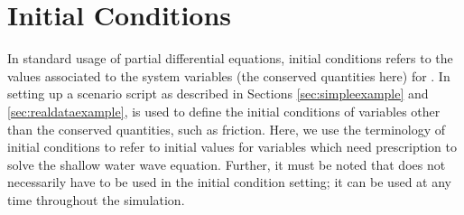 \documentclass{manual}
\begin{document}
\section{Initial Conditions}
\label{sec:initial conditions}
In standard usage of partial differential equations, initial conditions
refers to the values associated to the system variables (the conserved
quantities here) for . In setting up a scenario script
as described in Sections \ref{sec:simpleexample} and \ref{sec:realdataexample},
 is used to define the initial conditions of variables
other than the conserved quantities, such as friction. Here, we use the terminology
of initial conditions to refer to initial values for variables which need
prescription to solve the shallow water wave equation. Further, it must be noted
that  does not necessarily have to be used in the initial
condition setting; it can be used at any time throughout the simulation.
\end{document}
